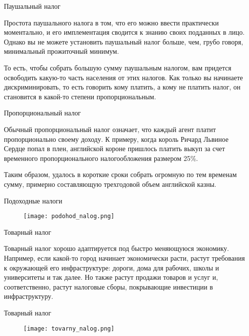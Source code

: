\documentclass{beamer}
\begin{document}
\begin{frame}{Паушальный налог}

Простота паушального налога в том, что его можно ввести практически моментально, и его имплементация сводится к знанию своих подданных в лицо. Однако вы не можете установить паушальный налог больше, чем, грубо говоря, минимальный прожиточный минимум. 

То есть, чтобы собрать большую сумму паушальным налогом, вам придется освободить какую-то часть населения от этих налогов. Как только вы начинаете дискриминировать, то есть говорить кому платить, а кому не платить налог, он становится в какой-то степени пропорциональным.

\end{frame}

\begin{frame}{Пропорциональный налог}

Обычный пропорциональный налог означает, что каждый агент платит пропорционально своему доходу. К примеру, когда король Ричард Львиное Сердце попал в плен, английской короне пришлось платить выкуп за счет временного пропорционального налогообложения размером 25\%. 

Таким образом, удалось в короткие сроки собрать огромную по тем временам сумму, примерно составляющую трехгодовой объем английской казны.

\end{frame}

\begin{frame}{Подоходные налоги}

\begin{figure}[hbt]
\centering
\texttt{[image: podohod\_nalog.png]}
\end{figure}

\end{frame}

\begin{frame}{Товарный налог}

Товарный налог хорошо адаптируется под быстро меняющуюся экономику. Например, если какой-то город начинает экономически расти, растут требования к окружающей его инфраструктуре: дороги, дома для рабочих, школы и университеты и так далее. Но также растут продажи товаров и услуг и, соответственно, растут налоговые сборы, покрывающие инвестиции в инфраструктуру.

\end{frame}

\begin{frame}{Товарный налог}

\begin{figure}[hbt]
\centering
\texttt{[image: tovarny\_nalog.png]}
\end{figure}

\end{frame}
\end{document}
